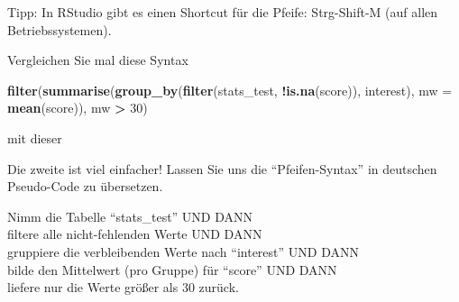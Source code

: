 \documentclass[12pt,ngerman,]{book}
\makeatletter
\newenvironment{Shaded}{\begin{snugshade}}{\end{snugshade}}
\newcommand{\KeywordTok}[1]{\textcolor[rgb]{0.13,0.29,0.53}{\textbf{#1}}}
\newcommand{\DataTypeTok}[1]{\textcolor[rgb]{0.13,0.29,0.53}{#1}}
\newcommand{\DecValTok}[1]{\textcolor[rgb]{0.00,0.00,0.81}{#1}}
\newcommand{\StringTok}[1]{\textcolor[rgb]{0.31,0.60,0.02}{#1}}
\newcommand{\CommentTok}[1]{\textcolor[rgb]{0.56,0.35,0.01}{\textit{#1}}}
\newcommand{\OperatorTok}[1]{\textcolor[rgb]{0.81,0.36,0.00}{\textbf{#1}}}
\newcommand{\NormalTok}[1]{#1}
\newenvironment{kframe}{%
\medskip{}
\setlength{\fboxsep}{.8em}
 \def\at@end@of@kframe{}%
 \ifinner\ifhmode%
  \def\at@end@of@kframe{\end{minipage}}%
  \begin{minipage}{\columnwidth}%
 \fi\fi%
 \def\FrameCommand##1{\hskip\@totalleftmargin \hskip-\fboxsep
 \colorbox{shadecolor}{##1}\hskip-\fboxsep
     \hskip-\linewidth \hskip-\@totalleftmargin \hskip\columnwidth}%
 \MakeFramed {\advance\hsize-\width
   \@totalleftmargin\z@ \linewidth\hsize
   \@setminipage}}%
 {\par\unskip\endMakeFramed%
 \at@end@of@kframe}
\renewenvironment{Shaded}{\begin{kframe}}{\end{kframe}}
\theoremstyle{definition}
\theoremstyle{definition}
\theoremstyle{remark}
\let\BeginKnitrBlock\begin \let\EndKnitrBlock\end
\makeatother
\begin{document}
\BeginKnitrBlock{rmdcaution}
Tipp: In RStudio gibt es einen Shortcut für die Pfeife: Strg-Shift-M
(auf allen Betriebssystemen).
\EndKnitrBlock{rmdcaution}

Vergleichen Sie mal diese Syntax

\begin{Shaded}
\begin{Highlighting}[]
\KeywordTok{filter}\NormalTok{(}\KeywordTok{summarise}\NormalTok{(}\KeywordTok{group_by}\NormalTok{(}\KeywordTok{filter}\NormalTok{(stats_test, }
       \OperatorTok{!}\KeywordTok{is.na}\NormalTok{(score)), interest), }\DataTypeTok{mw =} \KeywordTok{mean}\NormalTok{(score)), mw }\OperatorTok{>}\StringTok{ }\DecValTok{30}\NormalTok{)}
\end{Highlighting}
\end{Shaded}

mit dieser

\begin{Shaded}
\end{Shaded}

Die zweite ist viel einfacher! Lassen Sie uns die ``Pfeifen-Syntax'' in
deutschen Pseudo-Code zu übersetzen.

\BeginKnitrBlock{rmdpseudocode}
Nimm die Tabelle ``stats\_test'' UND DANN\\
filtere alle nicht-fehlenden Werte UND DANN\\
gruppiere die verbleibenden Werte nach ``interest'' UND DANN\\
bilde den Mittelwert (pro Gruppe) für ``score'' UND DANN\\
liefere nur die Werte größer als 30 zurück.
\EndKnitrBlock{rmdpseudocode}
\end{document}
